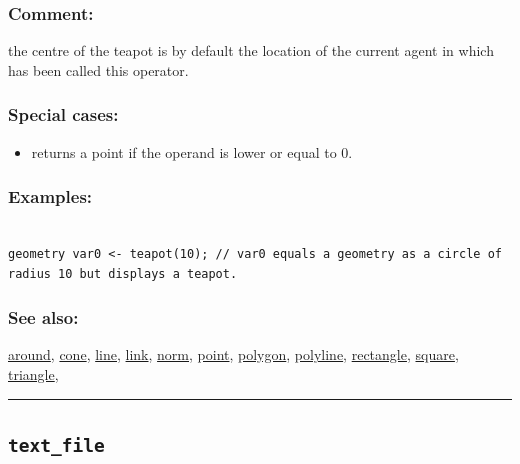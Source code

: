\documentclass[]{book}
\providecommand{\tightlist}{%
  \setlength{\itemsep}{0pt}\setlength{\parskip}{0pt}}
\theoremstyle{definition}
\theoremstyle{definition}
\theoremstyle{definition}
\theoremstyle{remark}
\begin{document}
\subsubsection{Comment:}\label{comment-98}

the centre of the teapot is by default the location of the current agent
in which has been called this operator.

\subsubsection{Special cases:}\label{special-cases-136}

\begin{itemize}
\tightlist
\item
  returns a point if the operand is lower or equal to 0.
\end{itemize}

\subsubsection{Examples:}\label{examples-357}

\begin{verbatim}
 
geometry var0 <- teapot(10); // var0 equals a geometry as a circle of radius 10 but displays a teapot.
\end{verbatim}

\subsubsection{See also:}\label{see-also-204}

\href{operators-a-to-a.html\#around}{around},
\href{operators-b-to-c.html\#cone}{cone},
\href{operators-i-to-m.html\#line}{line},
\href{operators-i-to-m.html\#link}{link},
\href{operators-n-to-r.html\#norm}{norm},
\href{operators-n-to-r.html\#point}{point},
\href{operators-n-to-r.html\#polygon}{polygon},
\href{operators-n-to-r.html\#polyline}{polyline},
\href{operators-n-to-r.html\#rectangle}{rectangle},
\href{operators-s-to-z.html\#square}{square},
\href{operators-s-to-z.html\#triangle}{triangle},

\begin{center}\rule{0.5\linewidth}{\linethickness}\end{center}

\subsection{\texorpdfstring{\texttt{text\_file}}{text\_file}}\label{text_file}
\end{document}
